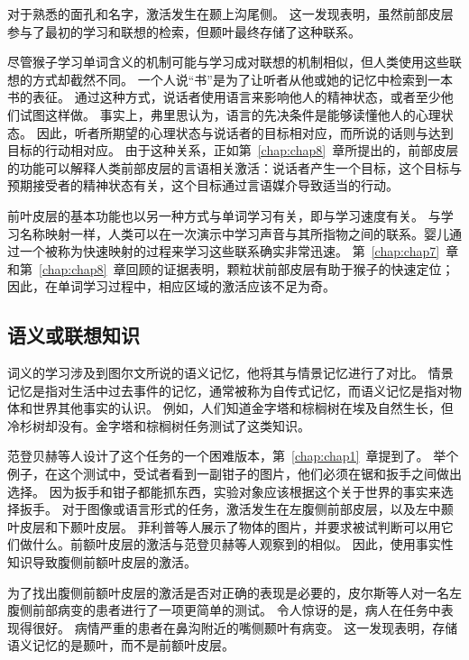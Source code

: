对于熟悉的面孔和名字，激活发生在颞上沟尾侧。
这一发现表明，虽然前部皮层参与了最初的学习和联想的检索，但颞叶最终存储了这种联系。
\par

尽管猴子学习单词含义的机制可能与学习成对联想的机制相似，但人类使用这些联想的方式却截然不同。
一个人说“书”是为了让听者从他或她的记忆中检索到一本书的表征。
通过这种方式，说话者使用语言来影响他人的精神状态，或者至少他们试图这样做。
事实上，弗里思\cite{frith2007making}认为，语言的先决条件是能够读懂他人的心理状态。
因此，听者所期望的心理状态与说话者的目标相对应，而所说的话则与达到目标的行动相对应。
由于这种关系，正如第~\ref{chap:chap8}~章所提出的，前部皮层的功能可以解释人类前部皮层的言语相关激活：说话者产生一个目标，这个目标与预期接受者的精神状态有关，这个目标通过言语媒介导致适当的行动。
\par


前叶皮层的基本功能也以另一种方式与单词学习有关，即与学习速度有关。
与学习名称映射一样，人类可以在一次演示中学习声音与其所指物之间的联系。婴儿通过一个被称为快速映射的过程来学习这些联系确实非常迅速\cite{bloom2002children}。
第~\ref{chap:chap7}~章和第~\ref{chap:chap8}~章回顾的证据表明，颗粒状前部皮层有助于猴子的快速定位；
因此，在单词学习过程中，相应区域的激活应该不足为奇。



\subsection{语义或联想知识}
\par
词义的学习涉及到图尔文\cite{tulving1983elements}所说的语义记忆，他将其与情景记忆进行了对比。
情景记忆是指对生活中过去事件的记忆，通常被称为自传式记忆，而语义记忆是指对物体和世界其他事实的认识。
例如，人们知道金字塔和棕榈树在埃及自然生长，但冷杉树却没有。金字塔和棕榈树任务测试了这类知识\cite{howard1992pyramids}。
\par


范登贝赫等人\cite{vandenberghe1996functional}设计了这个任务的一个困难版本，第~\ref{chap:chap1}~章提到了。
举个例子，在这个测试中，受试者看到一副钳子的图片，他们必须在锯和扳手之间做出选择。
因为扳手和钳子都能抓东西，实验对象应该根据这个关于世界的事实来选择扳手。
对于图像或语言形式的任务，激活发生在左腹侧前部皮层，以及左中颞叶皮层和下颞叶皮层。
菲利普等人\cite{phillips2002neural}展示了物体的图片，并要求被试判断可以用它们做什么。前额叶皮层的激活与范登贝赫等人观察到的相似。
因此，使用事实性知识导致腹侧前额叶皮层的激活。
\par


为了找出腹侧前额叶皮层的激活是否对正确的表现是必要的，皮尔斯等人\cite{price1999delineating}对一名左腹侧前部病变的患者进行了一项更简单的测试。
令人惊讶的是，病人在任务中表现得很好。
病情严重的患者在鼻沟附近的嘴侧颞叶有病变\cite{davies2004human}。
这一发现表明，存储语义记忆的是颞叶，而不是前额叶皮层。
\par


